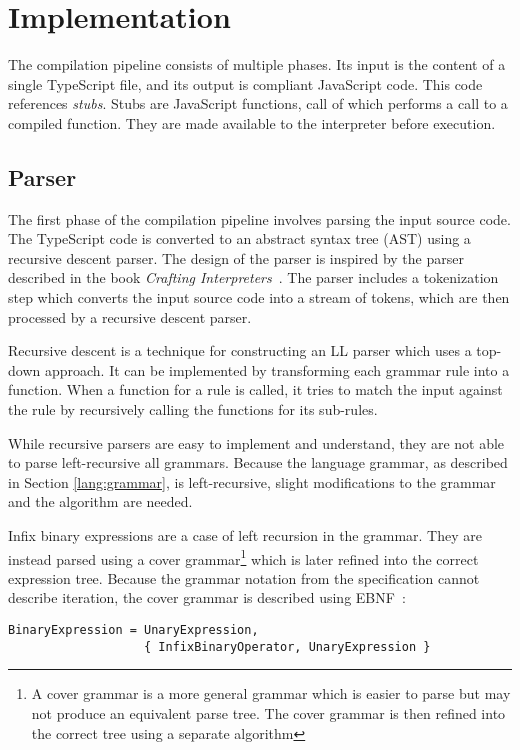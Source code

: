 \chapter{Implementation}

The compilation pipeline consists of multiple phases. Its input is the content of a single TypeScript file, and its output is compliant JavaScript code. This code references \textit{stubs}. Stubs are JavaScript functions, call of which performs a call to a compiled function. They are made available to the interpreter before execution.


\section{Parser}

The first phase of the compilation pipeline involves parsing the input source code. The TypeScript code is converted to an abstract syntax tree (AST) using a recursive descent parser. The design of the parser is inspired by the parser described in the book \textit{Crafting Interpreters}~\cite{craftinginterpreters}. The parser includes a tokenization step which converts the input source code into a stream of tokens, which are then processed by a recursive descent parser.

Recursive descent is a technique for constructing an LL parser which uses a top-down approach. It can be implemented by transforming each grammar rule into a function. When a function for a rule is called, it tries to match the input against the rule by recursively calling the functions for its sub-rules.

While recursive parsers are easy to implement and understand, they are not able to parse left-recursive all grammars. Because the language grammar, as described in Section \ref{lang:grammar}, is left-recursive, slight modifications to the grammar and the algorithm are needed.

Infix binary expressions are a case of left recursion in the grammar. They are instead parsed using a cover grammar\footnote{A cover grammar is a more general grammar which is easier to parse but may not produce an equivalent parse tree. The cover grammar is then refined into the correct tree using a separate algorithm} which is later refined into the correct expression tree. Because the grammar notation from the specification cannot describe iteration, the cover grammar is described using EBNF~\cite{iso14977}:

\begin{verbatim}
BinaryExpression = UnaryExpression,
                   { InfixBinaryOperator, UnaryExpression }
\end{verbatim}

